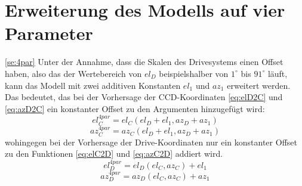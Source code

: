 \section{Erweiterung des Modells auf vier Parameter}
\ref{se:4par}
Unter der Annahme, dass die Skalen des Drivesystems einen Offset haben, also das der Wertebereich von $el_D$ beispielshalber von $1^{\circ}$ bis $91^{\circ}$ läuft, kann das Modell mit zwei additiven Konstanten $el_1$ und $az_1$ erweitert werden. Das bedeutet, das bei der Vorhersage der CCD-Koordinaten \ref{eq:elD2C} und \ref{eq:azD2C} ein konstanter Offset zu den Argumenten hinzugefügt wird:
\begin{equation}
el_C^{4par}=el_C(el_D+el_1,az_D+az_1)
\label{eq:elD2C4}
\end{equation}
\begin{equation}
az_C^{4par}=az_C(el_D+el_1,az_D+az_1)
\label{eq:azD2C4}
\end{equation}
wohingegen bei der Vorhersage der Drive-Koordinaten nur ein konstanter Offset zu den Funktionen \ref{eq:elC2D} und \ref{eq:azC2D} addiert wird.
\begin{equation}
el_D^{4par}=el_D(el_C,az_C)+el_1
\label{eq:elC2D4}
\end{equation}
\begin{equation}
az_D^{4par}=az_D(el_C,az_C)+az_1
\label{eq:azC2D4}
\end{equation}